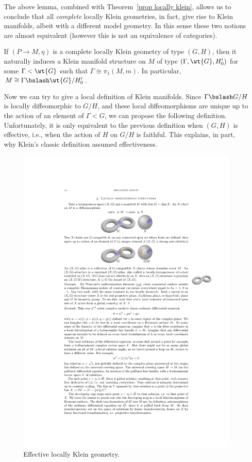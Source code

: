 The above lemma, combined with Theorem~\ref{prop locally klein}, allows us to conclude that all \emph{complete} locally Klein geometries, in fact, give rise to Klein manifolds, albeit with a different model geometry. In this sense these two notions are almost equivalent (however this is not an equivalence of categories).
\begin{cor}
    If $(P\to M,\eta)$ is a complete locally Klein geometry of type $(G,H)$, then it naturally induces a Klein manifold structure on $M$ of type $(\Gamma,\wt{G},H'_0)$ for some $\Gamma<\wt{G}$ such that $\Gamma\cong\pi_1(M,m)$. In particular, $M\cong \Gamma\bslash \wt{G}\slash H_0'$.
\end{cor}

Now we can try to give a local definition of Klein manifolds. Since $\Gamma\bslash G\slash H$ is locally diffeomorphic to $G\slash H$, and these local diffeomorphisms are unique up to the action of an element of $\Gamma<G$, we can propose the following definition. Unfortunately, it is only equivalent to the previous definition when $(G,H)$ is effective, i.e., when the action of $H$ on $G\slash H$ is faithful. This explains, in part, why Klein's classic definition assumed effectiveness.

\begin{figure}[tp]
    \centering
    \includegraphics[scale=1.2]{figures/Klein.pdf}
    \caption{Effective locally Klein geometry.}
    \label{fig:klein}
\end{figure}

